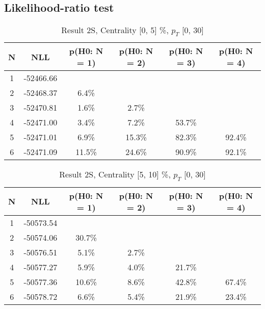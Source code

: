 \subsection{Likelihood-ratio test}
\begin{table}[htb]
	\begin{center}
	\caption{Result 2S, Centrality [0, 5] \%, $p_{T}$ [0, 30] \GeV
}
{\footnotesize\renewcommand{\arraystretch}{1.4}
		\begin{tabular}{cc||cc>{\columncolor[gray]{0.8}}cc}
			N & NLL & p(H0: N = 1) & p(H0: N = 2) & p(H0: N = 3) & p(H0: N = 4)\\ 
		\hline
1 & -52466.66 & & & & \\
2 & -52468.37 & 6.4\% & & & \\
3 & -52470.81 & 1.6\% & 2.7\% & & \\
4 & -52471.00 & 3.4\% & 7.2\% & 53.7\% & \\
5 & -52471.01 & 6.9\% & 15.3\% & 82.3\% & 92.4\% \\
6 & -52471.09 & 11.5\% & 24.6\% & 90.9\% & 92.1\% \\
	\end{tabular}
		\label{tab:lab}
	}
	\end{center}\end{table}

\begin{table}[htb]
	\begin{center}
	\caption{Result 2S, Centrality [5, 10] \%, $p_{T}$ [0, 30] \GeV
}
{\footnotesize\renewcommand{\arraystretch}{1.4}
		\begin{tabular}{cc||>{\columncolor[gray]{0.8}}cccc}
			N & NLL & p(H0: N = 1) & p(H0: N = 2) & p(H0: N = 3) & p(H0: N = 4)\\ 
		\hline
1 & -50573.54 & & & & \\
2 & -50574.06 & 30.7\% & & & \\
3 & -50576.51 & 5.1\% & 2.7\% & & \\
4 & -50577.27 & 5.9\% & 4.0\% & 21.7\% & \\
5 & -50577.36 & 10.6\% & 8.6\% & 42.8\% & 67.4\% \\
6 & -50578.72 & 6.6\% & 5.4\% & 21.9\% & 23.4\% \\
	\end{tabular}
		\label{tab:lab}
	}
	\end{center}\end{table}

